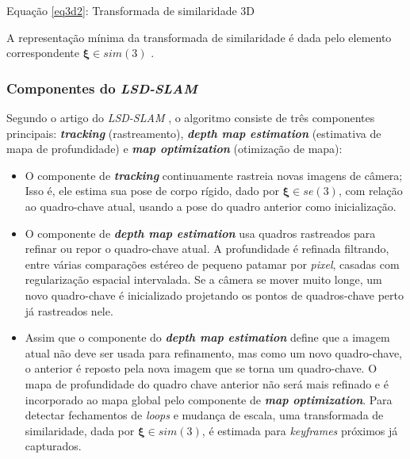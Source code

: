 Equação \eqref{eq3d2}: Transformada de similaridade 3D
 
A representação mínima da transformada de similaridade é dada pelo elemento correspondente $\mathbf{\xi} \in sim(3)$ \cite[p. 5]{LSD-SLAM-Artigo}.

\subsubsection{Componentes do \textit{LSD-SLAM}}

Segundo o artigo do \textit{LSD-SLAM} \cite{LSD-SLAM-Artigo}, o algoritmo consiste de três componentes principais: \textbf{\textit{tracking}} (rastreamento), \textbf{\textit{depth map estimation}} (estimativa de mapa de profundidade) e \textbf{\textit{map optimization}} (otimização de mapa):

\begin{itemize}
	\item{O componente de \textbf{\textit{tracking}} continuamente rastreia novas imagens de câmera; Isso é, ele estima sua pose de corpo rígido, dado por $\mathbf{\xi} \in se(3)$, com relação ao quadro-chave atual, usando a pose do quadro anterior como inicialização.}
	\item{O componente de \textbf{\textit{depth map estimation}} usa quadros rastreados para refinar ou repor o quadro-chave atual. A profundidade é refinada filtrando, entre várias comparações estéreo de pequeno patamar por \textit{pixel}, casadas com regularização espacial intervalada. Se a câmera se mover muito longe, um novo quadro-chave é inicializado projetando os pontos de quadros-chave perto já rastreados nele.}
	\item{Assim que o componente do \textbf{\textit{depth map estimation}} define que a imagem atual não deve ser usada para refinamento, mas como um novo quadro-chave, o anterior é reposto pela nova imagem que se torna um quadro-chave. O mapa de profundidade do quadro chave anterior não será mais refinado e é incorporado ao mapa global pelo componente de \textbf{\textit{map optimization}}. Para detectar fechamentos de \textit{loops} e mudança de escala, uma transformada de similaridade, dada por $\mathbf{\xi} \in sim(3)$, é estimada para \textit{keyframes} próximos já capturados.}
\end{itemize}	